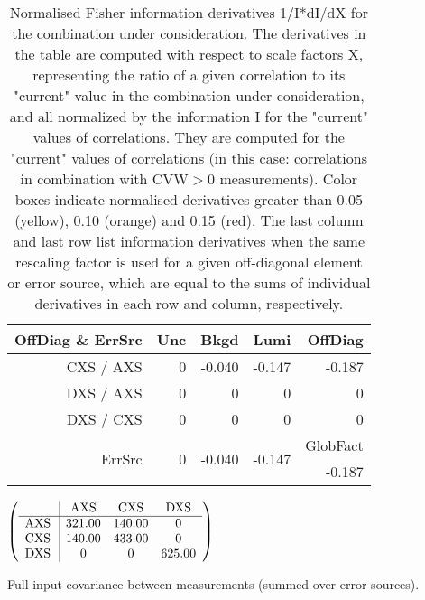 \begin{table}[H]
\scriptsize
\begin{center}
\renewcommand{\arraystretch}{1.1}
\begin{tabular}{|r|rrr|r|}
\hline
 OffDiag \& ErrSrc & {\tiny Unc} & {\tiny Bkgd} & {\tiny Lumi} & OffDiag\\
\hline
CXS / AXS &  0 &     -0.040 &     -0.147 &     -0.187 \\
DXS / AXS &  0 &  0 &  0 &  0 \\
DXS / CXS &  0 &  0 &  0 &  0 \\
\hline
\multirow{2}{*}{ErrSrc} & \multirow{2}{*}{ 0} & \multirow{2}{*}{    -0.040} & \multirow{2}{*}{    -0.147} & GlobFact\\
 & & & &     -0.187 \\
\hline
\end{tabular}
\renewcommand{\arraystretch}{1}
\caption{Normalised Fisher information derivatives 1/I*dI/dX for the combination under consideration. The derivatives in the table are computed with respect to scale factors X, representing the ratio of a given correlation to its "current" value in the combination under consideration, and all normalized by the information I for the "current" values of correlations. They are computed for the "current" values of correlations (in this case: correlations in combination with CVW$>$0 measurements). Color boxes indicate normalised derivatives greater than 0.05 (yellow), 0.10 (orange) and 0.15 (red). The last column and last row list information derivatives when the same rescaling factor is used for a given off-diagonal element or error source, which are equal to the sums of individual derivatives in each row and column, respectively.}
\end{center}
\end{table}
\begin{table}[H]
\scriptsize
\begin{center}
\renewcommand{\arraystretch}{1.1}
\begin{math}\left(\begin{array}{c|ccc}
 & \mathrm{AXS} & 
\mathrm{CXS} & 
\mathrm{DXS} \\
\hline
\mathrm{AXS} \hspace*{2pt} &     321.00 &     140.00 &  0 \\
\mathrm{CXS} \hspace*{2pt} &     140.00 &     433.00 &  0 \\
\mathrm{DXS} \hspace*{2pt} &  0 &  0 &     625.00 \\
\end{array}\right)\end{math}
\caption{Full input covariance between measurements (summed over error sources).}
\renewcommand{\arraystretch}{1}
\end{center}
\end{table}
